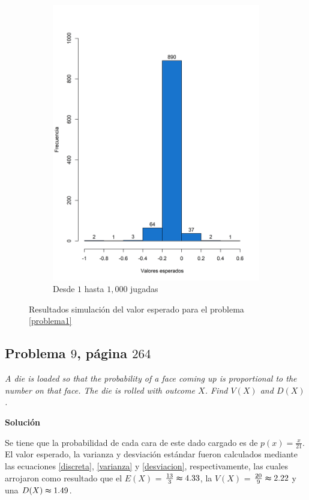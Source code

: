 \documentclass{article}
\begin{document}
\begin{figure}[h]
\begin{center}
\begin{subfigure}[b]{0.5\textwidth}
        \includegraphics[scale=0.45]{Figures/cartas1000.png}
        \caption{Desde $1$ hasta $1,000$ jugadas}
        \label{cartasb}
    \end{subfigure}
    \caption{Resultados simulación del valor esperado para el problema \ref{problema1}}
    \label{cartas}
    \end{center}
\end{figure}

\subsection{Problema $9$, página $264$} \label{problema2}
\textit{A die is loaded so that the probability of a face coming up is proportional to the number on that face. The die is rolled with outcome $X$. Find $V(X)$ and $D(X)$.}

\noindent \textbf{Solución}

Se tiene que la probabilidad de cada cara de este dado cargado es de $p{(x)} = \frac{x}{21}$. El valor esperado, la varianza y desviación estándar fueron calculados mediante las ecuaciones \ref{discreta}, \ref{varianza} y \ref{desviacion}, respectivamente, las cuales arrojaron como resultado que el $E{(X)}$ = $\frac{13}{3} \thickapprox 4.33$, la $V{(X)}$ = $\frac{20}{9} \thickapprox 2.22$ y una $D{(X)} \thickapprox 1.49$.
\end{document}
